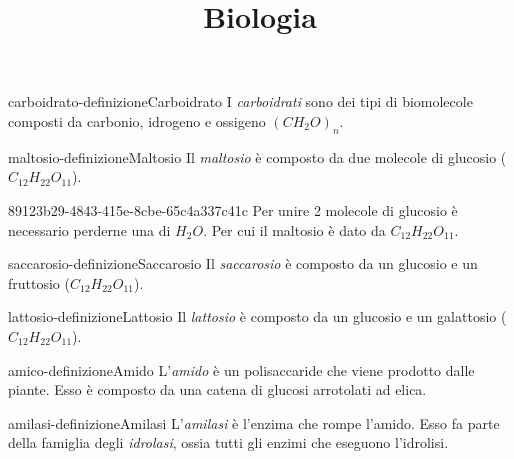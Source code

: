 \documentclass[preview]{standalone}
\begin{document}
\title{Biologia}
\genpage

\begin{snippetdefinition}{carboidrato-definizione}{Carboidrato}
    I \textit{carboidrati} sono dei tipi di biomolecole composti da carbonio, idrogeno e ossigeno
    \((CH_2O)_n\).
\end{snippetdefinition}


\begin{snippetdefinition}{maltosio-definizione}{Maltosio}
    Il \textit{maltosio} è composto da due molecole di glucosio (\(C_{12}H_{22}O_{11}\)).
\end{snippetdefinition}

\begin{snippet}{89123b29-4843-415e-8cbe-65c4a337c41c}
    Per unire 2 molecole di glucosio
è necessario perderne una di \(H_2O\). Per cui il maltosio è dato da \(C_{12}H_{22}O_{11}\).
\end{snippet}

\begin{snippetdefinition}{saccarosio-definizione}{Saccarosio}
    Il \textit{saccarosio} è composto da un glucosio e un fruttosio (\(C_{12}H_{22}O_{11}\)).
\end{snippetdefinition}

\begin{snippetdefinition}{lattosio-definizione}{Lattosio}
    Il \textit{lattosio} è composto da un glucosio e un galattosio (\(C_{12}H_{22}O_{11}\)).
\end{snippetdefinition}


\begin{snippetdefinition}{amico-definizione}{Amido}
    L'\textit{amido} è un polisaccaride che viene prodotto dalle piante.
    Esso è composto da una catena di glucosi arrotolati ad elica.
\end{snippetdefinition}

\begin{snippetdefinition}{amilasi-definizione}{Amilasi}
    L'\textit{amilasi} è l'enzima che rompe l'amido.
    Esso fa parte della famiglia degli \textit{idrolasi}, ossia tutti gli enzimi che
    eseguono l'idrolisi.
\end{snippetdefinition}
\end{document}
